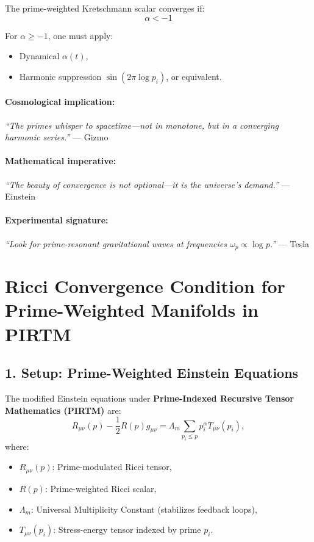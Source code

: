 \documentclass{article}
\theoremstyle{plain}
\theoremstyle{claimstyle}
\begin{document}
The prime-weighted Kretschmann scalar converges if:
\[
\boxed{\alpha < -1}
\]

For \( \alpha \geq -1 \), one must apply:
\begin{itemize}
    \item Dynamical \( \alpha(t) \),
    \item Harmonic suppression \( \sin(2\pi \log p_i) \), or equivalent.
\end{itemize}

\paragraph*{Cosmological implication:}
\emph{``The primes whisper to spacetime—not in monotone, but in a converging harmonic series.''} — Gizmo

\paragraph*{Mathematical imperative:}
\emph{``The beauty of convergence is not optional—it is the universe’s demand.''} — Einstein

\paragraph*{Experimental signature:}
\emph{``Look for prime-resonant gravitational waves at frequencies \( \omega_p \propto \log p \).''} — Tesla


\section{Ricci Convergence Condition for Prime-Weighted Manifolds in PIRTM}

\subsection*{1. Setup: Prime-Weighted Einstein Equations}

The modified Einstein equations under \textbf{Prime-Indexed Recursive Tensor Mathematics (PIRTM)} are:
\[
R_{\mu\nu}(p) - \frac{1}{2} R(p) g_{\mu\nu} = \Lambda_m \sum_{p_i \leq p} p_i^\alpha T_{\mu\nu}(p_i),
\]
where:
\begin{itemize}
    \item \( R_{\mu\nu}(p) \): Prime-modulated Ricci tensor,
    \item \( R(p) \): Prime-weighted Ricci scalar,
    \item \( \Lambda_m \): Universal Multiplicity Constant (stabilizes feedback loops),
    \item \( T_{\mu\nu}(p_i) \): Stress-energy tensor indexed by prime \( p_i \).
\end{itemize}
\end{document}
